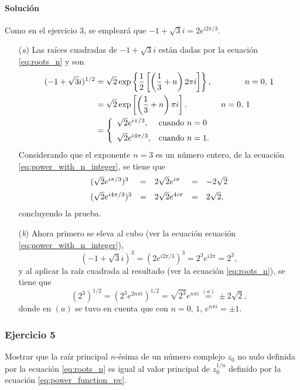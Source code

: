 \documentclass[a4paper]{report}
\begin{document}
\paragraph{Solución} Como en el ejercicio 3, se empleará que \(-1+\sqrt{3}i=2e^{i2\pi/3}\).
\begin{enumerate}
 \item[(\textit{a})] Las raíces cuadradas de \(-1+\sqrt{3}i\) están dadas por la ecuación \ref{eq:roots_n} y son
 \begin{align*}
  (-1+\sqrt{3}i)^{1/2}&=\sqrt{2}\exp\left\{\frac{1}{2}\left[\left(\frac{1}{3}+n\right)2\pi i\right]\right\},\qquad\qquad n=0,\,1\\
  &=\sqrt{2}\exp\left[\left(\frac{1}{3}+n\right)\pi i\right],\qquad\qquad n=0,\,1\\
  &=\left\{ 
   \begin{array}{ll}
    \sqrt{2}e^{i\pi/3}, &\textrm{cuando }n=0\\[\medskipamount]
    \sqrt{2}e^{i4\pi/3}, &\textrm{cuando }n=1.
   \end{array}
   \right.
 \end{align*}
 Considerando que el exponente \(n=3\) es un número entero, de la ecuación \ref{eq:power_with_n_integer}, se tiene que 
 \[
 \begin{array}{lllll}
  (\sqrt{2}e^{i\pi/3})^3&=&2\sqrt{2}e^{i\pi}&=&-2\sqrt{2}\\[\medskipamount]
  (\sqrt{2}e^{i4\pi/3})^3&=&2\sqrt{2}e^{4i\pi}&=&2\sqrt{2},
 \end{array}
 \]
 concluyendo la prueba.
 \item[(\textit{b})] Ahora primero se eleva al cubo (ver la ecuación ecuación \ref{eq:power_with_n_integer}),
 \[
  (-1+\sqrt{3}i)^3=(2e^{i2\pi/3})^3=2^3e^{i2\pi}=2^3,
 \]
 y al aplicar la raíz cuadrada al resultado (ver la ecuación \ref{eq:roots_n}), se tiene que 
 \[
  (2^3)^{1/2}=(2^3e^{2n\pi i})^{1/2}=\sqrt{2^3}e^{n\pi i}\overset{(a)}{=}\pm2\sqrt{2},
 \]
 donde en \((a)\) se tuvo en cuenta que con \(n=0,\,1\), \(e^{n\pi i}=\pm1\).
\end{enumerate}

\subsubsection{Ejercicio 5}

Mostrar que la raíz principal \(n\)-ésima de un número complejo \(z_0\) no nulo definida por la ecuación \ref{eq:roots_n} es igual al valor principal de \(z_0^{1/n}\) definido por la ecuación \ref{eq:power_function_pv}.
\end{document}
